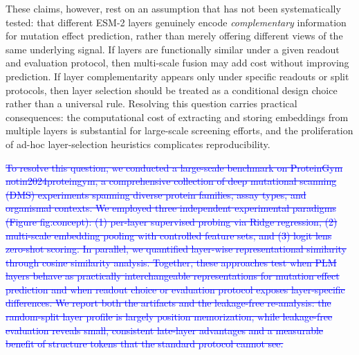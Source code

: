 \documentclass[11pt,a4paper]{article}
\begin{document}
These claims, however, rest on an assumption that has not been systematically tested:
that different ESM-2 layers genuinely encode \emph{complementary} information for
mutation effect prediction, rather than merely offering different views of the same
underlying signal. If layers are functionally similar under a given readout and
evaluation protocol, then multi-scale fusion may add cost without improving prediction.
If layer complementarity appears only under specific readouts or split protocols,
then layer selection should be treated as a conditional design choice rather than
a universal rule. Resolving this question carries practical
consequences: the computational cost of extracting and storing embeddings from
multiple layers is substantial for large-scale screening efforts, and the
proliferation of ad-hoc layer-selection heuristics complicates reproducibility.

\textcolor{blue}{\sout{To resolve this question, we conducted a large-scale benchmark on ProteinGym notin2024proteingym,
a comprehensive collection of deep mutational scanning (DMS) experiments spanning
diverse protein families, assay types, and organismal contexts. We employed
three independent experimental paradigms (Figure fig:concept): (1) per-layer supervised probing via Ridge
regression, (2) multi-scale embedding pooling with controlled feature sets, and
(3) logit lens zero-shot scoring. In parallel, we quantified layer-wise representational
similarity through cosine similarity analysis. Together, these approaches test when
PLM layers behave as practically interchangeable representations for mutation effect
prediction and when readout choice or evaluation protocol exposes layer-specific
differences. We report both the artifacts and the leakage-free re-analysis:
the random-split layer profile is largely position memorization, while leakage-free
evaluation reveals small, consistent late-layer advantages and a measurable benefit of
structure tokens that the standard protocol cannot see.}}
\end{document}
